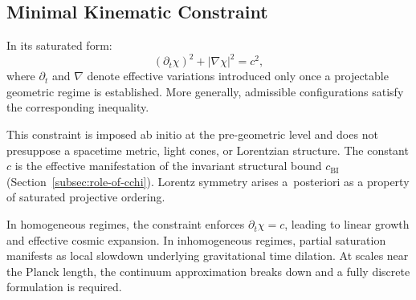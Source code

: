 \subsection{Minimal Kinematic Constraint}
  \label{subsec:minimal-kinematic-constraint}

  In its saturated form:
  \begin{equation}
    (\partial_t\chi)^2 + |\nabla\chi|^2 = c^2,
    \label{eq:minimal-kinematic-constraint}
  \end{equation}
  where $\partial_t$ and $\nabla$ denote effective variations introduced
  only once a projectable geometric regime is established.
  More generally, admissible configurations satisfy the corresponding
  inequality.

  This constraint is imposed ab initio at the pre-geometric level and
  does not presuppose a spacetime metric, light cones, or Lorentzian
  structure.
  The constant $c$ is the effective manifestation of the invariant
  structural bound $c_{\mathrm{BI}}$
  (Section~\ref{subsec:role-of-cchi}).
  Lorentz symmetry arises a~posteriori as a property of saturated
  projective ordering.

  In homogeneous regimes, the constraint enforces
  $\partial_t\chi = c$, leading to linear growth and effective cosmic
  expansion.
  In inhomogeneous regimes, partial saturation manifests as local
  slowdown underlying gravitational time dilation.
  At scales near the Planck length, the continuum approximation breaks
  down and a fully discrete formulation is required.
